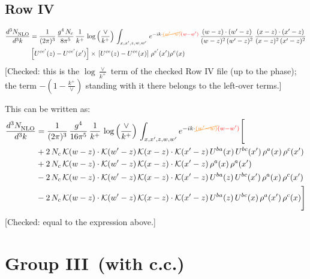 \documentclass[9pt]{article}
\numberwithin{equation}{section}
\begin{document}
\subsection{Row IV}
\begin{align}
    \frac{d^{3}N_{\rm NLO}^{\rm}}{d^{3}k}  & =      \frac{1}{(2\pi)^{3}}\,\frac{g^{4}\,N_{c}}{8\pi^{5}}\,\frac{1}{k^{+}}\,\log{\left(\frac{\vee}{k^{+}}\right)}\,\int_{x,x',z,w,w'}\,e^{-ik\cdot {\color{orange}\cancel{(w'-w)}}{\color{red}(w-w')}}\,\frac{(w-z)\cdot(w'-z)}{(w-z)^{2}\,(w'-z)^{2}}\,\frac{(x-z)\cdot(x'-z)}{(x-z)^{2}\,(x'-z)^{2}}\notag \\ &   \left[U^{ce'}(z) - U^{ce'}(x')\right] \times\, \left[U^{ce}(z) - U^{ce}(x)\right]\, \rho^{e'}(x') \rho^{e}(x)
\end{align} {\color{red}[Checked: this is the $\log\frac{\vee}{k^{+}}$ term of the checked Row IV file (up to the phase); the term $-(1-\frac{k^{+}}{\vee})$ standing with it there belongs to the left-over terms.]}\par\noindent 
This can be written as: 
\begin{align}
    \frac{d^{3}N_{\rm NLO}^{\rm}}{d^{3}k}  & = \frac{1}{(2\pi)^{3}}\,\frac{g^{4}}{16\pi^{5}}\,\frac{1}{k^{+}}\,\log{\left(\frac{\vee}{k^{+}}\right)}\, \int_{x,x',z,w,w'}e^{-ik\cdot{\color{orange}\cancel{(w'-w)}}{\color{red}(w-w')}}\Bigg[\notag\\ & +2\,N_{c}\,\mathcal{K}(w-z)\cdot\mathcal{K}(w'-z)\,\mathcal{K}(x-z)\cdot\mathcal{K}(x'-z)\,U^{ba}(x)\,U^{bc}(x')\,\rho^{a}(x)\,\rho^{c}(x')\notag \\ 
&+2\,N_{c}\,\mathcal{K}(w-z)\cdot\mathcal{K}(w'-z)\,\mathcal{K}(x-z)\cdot\mathcal{K}(x'-z)\,\rho^{a}(x)\,\rho^{a}(x')\notag \\ 
&-2\,N_{c}\,\mathcal{K}(w-z)\cdot\mathcal{K}(w'-z)\,\mathcal{K}(x-z)\cdot\mathcal{K}(x'-z)\,U^{ba}(z)\,U^{bc}(x')\,\rho^{a}(x)\,\rho^{c}(x')\notag \\ 
&-2\,N_{c}\,\mathcal{K}(w-z)\cdot\mathcal{K}(w'-z)\,\mathcal{K}(x-z)\cdot\mathcal{K}(x'-z)\,U^{ba}(z)\,U^{bc}(x)\,\rho^{a}(x')\,\rho^{c}(x)\Bigg]
\end{align} {\color{red}[Checked: equal to the expression above.]}\par\noindent 
\section{Group III\, (with c.c.)}
\end{document}

